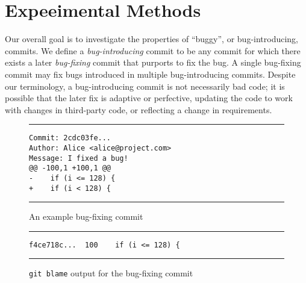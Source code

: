 \section{Expeeimental Methods}
\label{sec:method}

Our overall goal is to investigate the properties of ``buggy'', or
bug-introducing, commits. We define a \emph{bug-introducing} commit to be any
commit for which there exists a later \emph{bug-fixing} commit that purports to
fix the bug. A single bug-fixing commit may fix bugs introduced in multiple
bug-introducing commits. Despite our terminology, a bug-introducing commit is
not necessarily bad code; it is possible that the later fix is adaptive or
perfective, updating the code to work with changes in third-party code, or
reflecting a change in requirements.

\begin{figure}[t!bh]
\centering
\rule{0.92\columnwidth}{0.5pt}
\begin{minipage}[h]{0.92\columnwidth}
\begin{lstlisting}[basicstyle=\small]
Commit: 2cdc03fe...
Author: Alice <alice@project.com>
Message: I fixed a bug!
@@ -100,1 +100,1 @@
-    if (i <= 128) {
+    if (i < 128) {
\end{lstlisting}
\end{minipage}
\rule{0.92\columnwidth}{0.5pt}
\caption{\label{fig-fix}An example bug-fixing commit}
\end{figure}

\begin{figure}[t!bh]
\centering
\rule{0.92\columnwidth}{0.5pt}
\begin{minipage}[h]{0.92\columnwidth}
\begin{lstlisting}[basicstyle=\small]
f4ce718c...  100    if (i <= 128) {
\end{lstlisting}
\end{minipage}
\rule{0.92\columnwidth}{0.5pt}
\caption{\label{fig-blame}{\tt git blame} output for the bug-fixing commit}
\end{figure}

